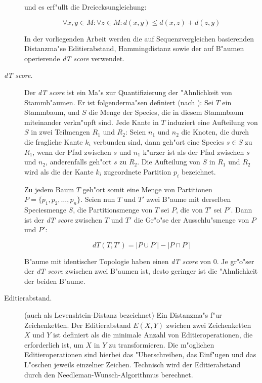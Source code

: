 \begin{description}
und es erf"ullt die Dreiecksungleichung:

\begin{displaymath}
\forall x, y \in M : \forall z \in M : d(x, y) \leq d(x, z) + d(z, y)
\end{displaymath}

In der vorliegenden Arbeit werden die auf Sequenzvergleichen basierenden
Distanzma"se Editierabstand, Hammingdistanz
sowie der auf B"aumen operierende \textsl{dT score} verwendet.

\item[{\slshape dT score}.] Der {\slshape dT score} ist ein Ma"s zur Quantifizierung
der "Ahnlichkeit von Stammb"aumen.
Er ist folgenderma"sen definiert (nach \cite{KuhnerFelsenstein}):
Sei $T$ ein Stammbaum, und $S$
die Menge der Species, die in diesem Stammbaum miteinander verkn"upft sind. Jede Kante
in $T$ induziert eine Aufteilung von $S$ in zwei Teilmengen $R_1$ und $R_2$: Seien
$n_1$ und $n_2$ die Knoten, die durch die fragliche Kante $k_i$ verbunden sind, dann geh"ort
eine Species $s \in S$ zu $R_1$, wenn der Pfad zwischen $s$ und $n_1$ k"urzer ist als
der Pfad zwischen $s$ und $n_2$, anderenfalls geh"ort $s$ zu $R_2$. Die Aufteilung von $S$
in $R_1$ und $R_2$ wird als die der Kante $k_i$ zugeordnete Partition $p_i$ bezeichnet.

Zu jedem Baum $T$ geh"ort somit eine Menge von Partitionen $P = \{p_1, p_2, \ldots, p_n\}$.
Seien nun $T$ und $T'$ zwei B"aume mit derselben Speciesmenge $S$, die Partitionsmenge
von $T$ sei $P$, die von $T'$ sei $P'$. Dann ist der {\slshape dT score} zwischen $T$
und $T'$ die Gr"o"se der Ausschlu"smenge von $P$ und $P'$:

\begin{displaymath}
dT(T, T') = | P \cup P' | - |P \cap P'|
\end{displaymath}

B"aume mit identischer Topologie haben einen {\slshape dT score} von 0. Je gr"o"ser der {\slshape dT score}
zwischen zwei B"aumen ist, desto geringer ist die "Ahnlichkeit der beiden B"aume.

\item[Editierabstand.] (auch als Levenshtein-Distanz bezeichnet) Ein
Distanzma"s f"ur Zeichenketten. Der Editierabstand $E(X,Y)$ zwichen
zwei Zeichenketten $X$ und $Y$ ist
definiert als die minimale Anzahl von Editieroperationen, die erforderlich
ist, um $X$ in $Y$ zu transformieren. Die m"oglichen Editieroperationen
sind hierbei das "Uberschreiben, das Einf"ugen und das L"oschen jeweils
einzelner Zeichen. Technisch wird der Editierabstand durch den 
Needleman-Wunsch-Algorithmus \cite{NeedlemanWunsch} berechnet.


\end{description}
